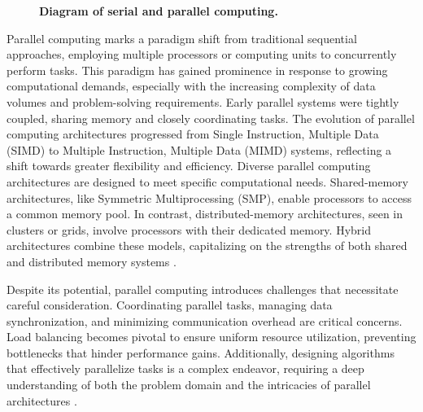 \documentclass[Ingles]{phdthesis}
\begin{document}
\begin{figure}
  \caption[Diagram of serial and parallel computing]{\textbf{Diagram of serial and parallel computing.}}
  \label{fig:computing-strategies}
\end{figure}

Parallel computing marks a paradigm shift from traditional sequential approaches, employing multiple processors or computing units to concurrently perform tasks. This paradigm has gained prominence in response to growing computational demands, especially with the increasing complexity of data volumes and problem-solving requirements. Early parallel systems were tightly coupled, sharing memory and closely coordinating tasks. The evolution of parallel computing architectures progressed from Single Instruction, Multiple Data (SIMD) to Multiple Instruction, Multiple Data (MIMD) systems, reflecting a shift towards greater flexibility and efficiency. Diverse parallel computing architectures are designed to meet specific computational needs. Shared-memory architectures, like Symmetric Multiprocessing (SMP), enable processors to access a common memory pool. In contrast, distributed-memory architectures, seen in clusters or grids, involve processors with their dedicated memory. Hybrid architectures combine these models, capitalizing on the strengths of both shared and distributed memory systems \cite{matloff2012}.

Despite its potential, parallel computing introduces challenges that necessitate careful consideration. Coordinating parallel tasks, managing data synchronization, and minimizing communication overhead are critical concerns. Load balancing becomes pivotal to ensure uniform resource utilization, preventing bottlenecks that hinder performance gains. Additionally, designing algorithms that effectively parallelize tasks is a complex endeavor, requiring a deep understanding of both the problem domain and the intricacies of parallel architectures \cite{grama2003,matloff2012}.
\end{document}
